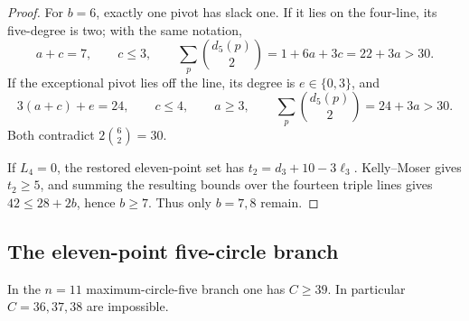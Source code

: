 \begin{proof}
For $b=6$, exactly one pivot has slack one.  If it lies on the four-line,
its five-degree is two; with the same notation,
\[
 a+c=7,\qquad c\le3,\qquad
 \sum_p\binom{d_5(p)}2=1+6a+3c=22+3a>30.
\]
If the exceptional pivot lies off the line, its degree is
$e\in\{0,3\}$, and
\[
 3(a+c)+e=24,\qquad c\le4,\qquad a\ge3,\qquad
 \sum_p\binom{d_5(p)}2=24+3a>30.
\]
Both contradict $2\binom62=30$.

If $L_4=0$, the restored eleven-point set has
$t_2=d_3+10-3\ell_3$.  Kelly--Moser gives $t_2\ge5$, and summing the
resulting bounds over the fourteen triple lines gives
$42\le28+2b$, hence $b\ge7$.  Thus only $b=7,8$ remain.
\end{proof}

\subsection{The eleven-point five-circle branch}

\begin{lemma}\label{lem:n11-g5-low}
In the $n=11$ maximum-circle-five branch one has $C\ge39$.  In particular
$C=36,37,38$ are impossible.
\end{lemma}

